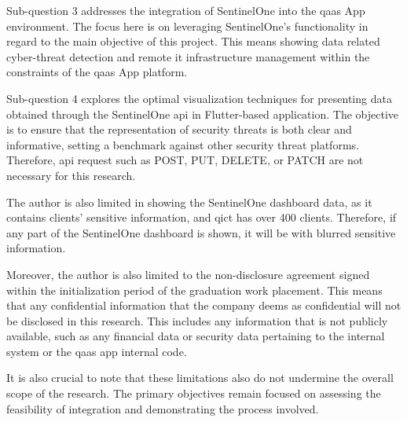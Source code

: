 Sub-question 3 addresses the integration of SentinelOne into the \acrshort{qaas} App environment. The focus here is on leveraging SentinelOne's
functionality in regard to the main objective of this project. This means showing data related cyber-threat detection and remote
\acrshort{it} infrastructure management within the constraints of the \acrshort{qaas} App platform.

Sub-question 4 explores the optimal visualization techniques for presenting data obtained through the SentinelOne \acrshort{api} in
Flutter-based application. The objective is to ensure that the representation of security threats is both clear and informative, setting a
benchmark against other security threat platforms. Therefore, \acrshort{api} request such as POST, PUT, DELETE, or PATCH are not necessary for
this research.

The author is also limited in showing the SentinelOne dashboard data, as it contains clients' sensitive
information, and \acrshort{qict} has over 400 clients. Therefore, if any part of the SentinelOne dashboard is
shown, it will be with blurred sensitive information.

Moreover, the author is also limited to the non-disclosure agreement signed within the initialization period of
the graduation work placement. This means that any confidential information that the company deems as confidential
will not be disclosed in this research. This includes any information that is not publicly available, such as any
financial data or security data pertaining to the internal system or the \acrshort{qaas} app internal code.

It is also crucial to note that these limitations also do not undermine the overall scope of the research. The
primary objectives remain focused on assessing the feasibility of integration and demonstrating the process involved.
